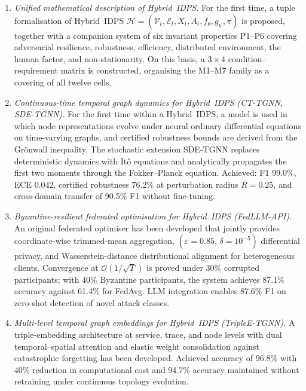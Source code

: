 \documentclass[12pt,a5paper]{article}
\begin{document}
\begin{enumerate}
\item \textit{Unified mathematical description of Hybrid~IDPS.}
For the first time, a tuple formalisation of Hybrid~IDPS
$\mathcal{H} = (\mathcal{V}_t, \mathcal{E}_t, X_t, A_t,
f_\theta, g_\psi, \pi)$ is proposed, together with a
companion system of six invariant properties P1--P6 covering
adversarial resilience, robustness, efficiency, distributed
environment, the human factor, and non-stationarity. On this
basis, a $3\times4$ condition--requirement matrix is
constructed, organising the M1--M7 family as a covering of all
twelve cells.

\item \textit{Continuous-time temporal graph dynamics for
Hybrid~IDPS (CT-TGNN, SDE-TGNN).} For the first time within a
Hybrid~IDPS, a model is used in which node representations
evolve under neural ordinary differential equations on
time-varying graphs, and certified robustness bounds are
derived from the Gr\"{o}nwall inequality. The stochastic
extension SDE-TGNN replaces deterministic dynamics with It\^{o}
equations and analytically propagates the first two moments
through the Fokker--Planck equation. Achieved: F1 99.0\%, ECE
0.042, certified robustness 76.2\% at perturbation radius
$R{=}0.25$, and cross-domain transfer of 90.5\% F1 without
fine-tuning.

\item \textit{Byzantine-resilient federated optimisation for
Hybrid~IDPS (FedLLM-API).} An original federated optimiser has
been developed that jointly provides coordinate-wise
trimmed-mean aggregation, $(\varepsilon{=}0.85,\,\delta{=}10^{-5})$
differential privacy, and Wasserstein-distance distributional
alignment for heterogeneous clients. Convergence at
$\mathcal{O}(1/\sqrt{T})$ is proved under 30\% corrupted
participants; with 40\% Byzantine participants, the system
achieves 87.1\% accuracy against 61.4\% for FedAvg. LLM
integration enables 87.6\% F1 on zero-shot detection of novel
attack classes.

\item \textit{Multi-level temporal graph embeddings for
Hybrid~IDPS (TripleE-TGNN).} A triple-embedding architecture
at service, trace, and node levels with dual
temporal--spatial attention and elastic weight consolidation
against catastrophic forgetting has been developed. Achieved
accuracy of 96.8\% with 40\% reduction in computational cost
and 94.7\% accuracy maintained without retraining under
continuous topology evolution.


\end{enumerate}
\end{document}
